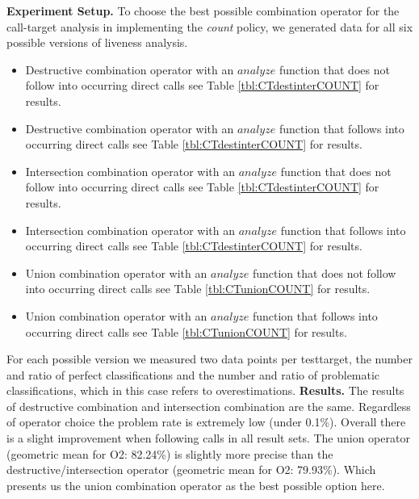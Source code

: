 \textbf{Experiment Setup.}
To choose the best possible combination operator for the call-target analysis in implementing the \textit{count} policy, we generated data for all six possible versions 
of liveness analysis.
\begin{itemize}
\item Destructive combination operator with an $analyze$ function that does not follow into occurring direct calls see Table \ref{tbl:CTdestinterCOUNT} for results.
\item Destructive combination operator with an $analyze$ function that follows into occurring direct calls see Table \ref{tbl:CTdestinterCOUNT} for results.
\item Intersection combination operator with an $analyze$ function that does not follow into occurring direct calls see Table \ref{tbl:CTdestinterCOUNT} for results.
\item Intersection combination operator with an $analyze$ function that follows into occurring direct calls see Table \ref{tbl:CTdestinterCOUNT} for results.
\item Union combination operator with an $analyze$ function that does not follow into occurring direct calls see Table \ref{tbl:CTunionCOUNT} for results.
\item Union combination operator with an $analyze$ function that follows into occurring direct calls see Table \ref{tbl:CTunionCOUNT} for results.
\end{itemize}
For each possible version we measured two data points per testtarget, the number and ratio of perfect classifications and the number and ratio of problematic 
classifications, which in this case refers to overestimations.
\textbf{Results.} The results of destructive combination and intersection combination are the same. Regardless of operator choice the problem rate is extremely
low (under 0.1\%). 
Overall there is a slight improvement when following calls in all result sets. The union operator (geometric mean for O2: 82.24\%) is slightly more precise than 
the destructive/intersection operator (geometric mean for O2: 79.93\%). Which presents us the union combination operator as the best possible option here.



